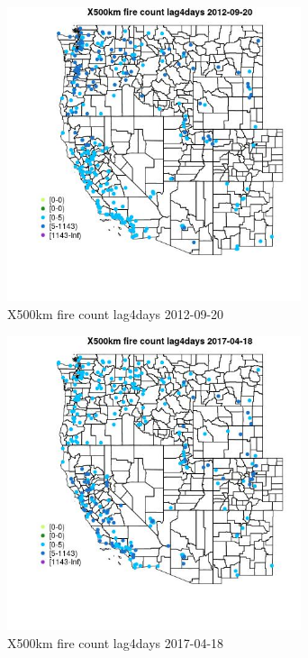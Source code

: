 \begin{figure} 
\centering  
\includegraphics[width=0.77\textwidth]{Code_Outputs/Report_ML_input_PM25_Step4_part_e_de_duplicated_aves_compiled_2019-05-14wNAs_MapObsX500km_fire_count_lag4days2012-09-20.jpg} 
\caption{\label{fig:Report_ML_input_PM25_Step4_part_e_de_duplicated_aves_compiled_2019-05-14wNAsMapObsX500km_fire_count_lag4days2012-09-20}X500km fire count lag4days 2012-09-20} 
\end{figure} 
 

\clearpage 

\begin{figure} 
\centering  
\includegraphics[width=0.77\textwidth]{Code_Outputs/Report_ML_input_PM25_Step4_part_e_de_duplicated_aves_compiled_2019-05-14wNAs_MapObsX500km_fire_count_lag4days2017-04-18.jpg} 
\caption{\label{fig:Report_ML_input_PM25_Step4_part_e_de_duplicated_aves_compiled_2019-05-14wNAsMapObsX500km_fire_count_lag4days2017-04-18}X500km fire count lag4days 2017-04-18} 
\end{figure} 
 

